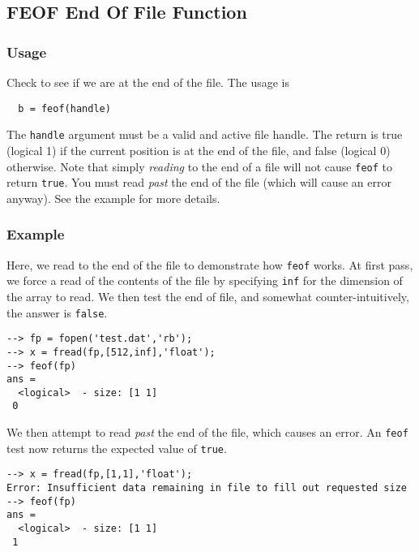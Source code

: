 %
%
%
\subsection{FEOF End Of File Function}
\subsubsection{Usage}
Check to see if we are at the end of the file.  The usage is
\begin{verbatim}
  b = feof(handle)
\end{verbatim}
The \verb|handle| argument must be a valid and active file handle.  The
return is true (logical 1) if the current position is at the end of
the file, and false (logical 0) otherwise.  Note that simply \emph{reading} 
to the end of a file will not cause \verb|feof| to return \verb|true|.  
You must read \emph{past} the end of the file (which will cause an error 
anyway).  See the example for more details.
\subsubsection{Example}
Here, we read to the end of the file to demonstrate how \verb|feof| works.
At first pass, we force a read of the contents of the file by specifying
\verb|inf| for the dimension of the array to read.  We then test the
end of file, and somewhat counter-intuitively, the answer is \verb|false|.
\begin{verbatim}
--> fp = fopen('test.dat','rb');
--> x = fread(fp,[512,inf],'float');
--> feof(fp)
ans =
  <logical>  - size: [1 1]
 0
\end{verbatim}
We then attempt to read \emph{past} the end of the file, which causes an
error.  An \verb|feof| test now returns the expected value of \verb|true|.
\begin{verbatim}
--> x = fread(fp,[1,1],'float');
Error: Insufficient data remaining in file to fill out requested size
--> feof(fp)
ans =
  <logical>  - size: [1 1]
 1
\end{verbatim}
